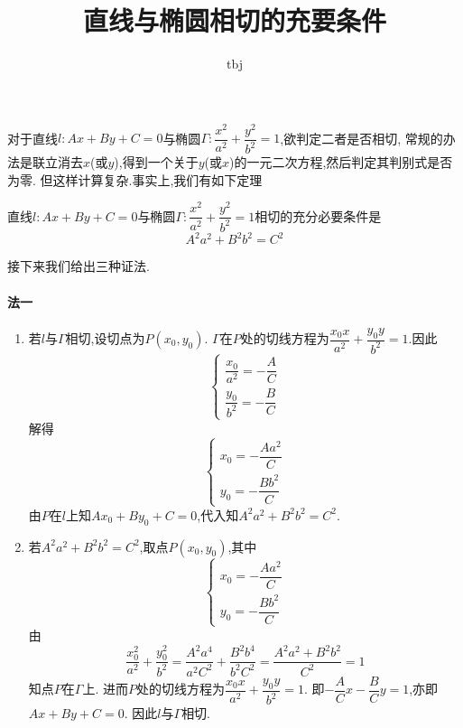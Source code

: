 \documentclass{article}
\title{直线与椭圆相切的充要条件}
\author{tbj}
\date{}
\begin{document}
\maketitle

对于直线$l: Ax + By + C = 0$与椭圆$\Gamma: \dfrac{x^2}{a^2} + \dfrac{y^2}{b^2} = 1$,欲判定二者是否相切,
常规的办法是联立消去$x$(或$y$),得到一个关于$y$(或$x$)的一元二次方程,然后判定其判别式是否为零.
但这样计算复杂.事实上,我们有如下定理

\begin{thm}
    直线$l: Ax + By + C = 0$与椭圆$\Gamma: \dfrac{x^2}{a^2} + \dfrac{y^2}{b^2} = 1$相切的充分必要条件是
    \[ A^2a^2 + B^2b^2 = C^2 \]
\end{thm}

接下来我们给出三种证法.

\paragraph{法一}

\begin{enumerate}[label=(\arabic*)]
    \item \label{1} 若$l$与$\Gamma$相切,设切点为$P(x_0, y_0)$.
        $\Gamma$在$P$处的切线方程为$\dfrac{x_0x}{a^2} + \dfrac{y_0y}{b^2} = 1$.因此
        \[ \begin{cases}
            \dfrac{x_0}{a^2} = -\dfrac{A}{C} \\
            \dfrac{y_0}{b^2} = -\dfrac{B}{C}
        \end{cases} \]
        解得
        \[ \begin{cases}
            x_0 = -\dfrac{Aa^2}{C} \\
            y_0 = -\dfrac{Bb^2}{C}
        \end{cases} \]
        由$P$在$l$上知$Ax_0 + By_0 + C = 0$,代入知$A^2a^2 + B^2b^2 = C^2$.
    \item \label{2} 若$A^2a^2 + B^2b^2 = C^2$,取点$P(x_0, y_0)$,其中
        \[ \begin{cases}
            x_0 = -\dfrac{Aa^2}{C} \\
            y_0 = -\dfrac{Bb^2}{C}
        \end{cases} \]
        由\[ \dfrac{x_0^2}{a^2} + \dfrac{y_0^2}{b^2} = \dfrac{A^2a^4}{a^2C^2} + \dfrac{B^2b^4}{b^2C^2}
        = \dfrac{A^2a^2 + B^2b^2}{C^2} = 1 \]知点$P$在$\Gamma$上.
        进而$P$处的切线方程为$\dfrac{x_0x}{a^2} + \dfrac{y_0y}{b^2} = 1$.
        即$-\dfrac{A}{C} x - \dfrac{B}{C} y = 1$,亦即$Ax + By + C = 0$.
        因此$l$与$\Gamma$相切.
\end{enumerate}
\end{document}
